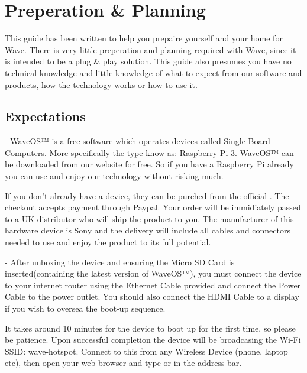 \documentclass[letterpaper,10pt,english]{sphinxmanual}
\begin{document}
\section{Preperation \& Planning}
\label{\detokenize{preperation:preperation-planning}}\label{\detokenize{preperation::doc}}
This guide has been written to help you prepaire yourself and your home for Wave.
There is very little preperation and planning required with Wave, since it is intended to be a plug \& play solution.
This guide also presumes you have no technical knowledge and little knowledge of what to expect from our software and products, how the technology works or how to use it.


\subsection{Expectations}
\label{\detokenize{preperation:expectations}}
 - WaveOS™ is a free software which operates devices called Single Board Computers. More specifically the type know as: Raspberry Pi 3. WaveOS™ can be downloaded from our website for free. So if you have a Raspberry Pi already you can use and enjoy our technology without risking much.

If you don’t already have a device, they can be purched from the official . The checkout accepts payment through Paypal. Your order will be immidiately passed to a UK distributor who will ship the product to you. The manufacturer of this hardware device is Sony and the delivery will include all cables and connectors needed to use and enjoy the product to its full potential.

 - After unboxing the device and ensuring the Micro SD Card is inserted(containing the latest version of WaveOS™), you must connect the device to your internet router using the Ethernet Cable provided and connect the Power Cable to the power outlet. You should also connect the HDMI Cable to a display if you wish to oversea the boot-up sequence.

It takes around 10 minutes for the device to boot up for the first time, so please be patience. Upon successful completion the device will be broadcasing the Wi-Fi SSID: wave-hotspot. Connect to this from any Wireless Device (phone, laptop etc), then open your web browser and type  or  in the address bar.
\end{document}
